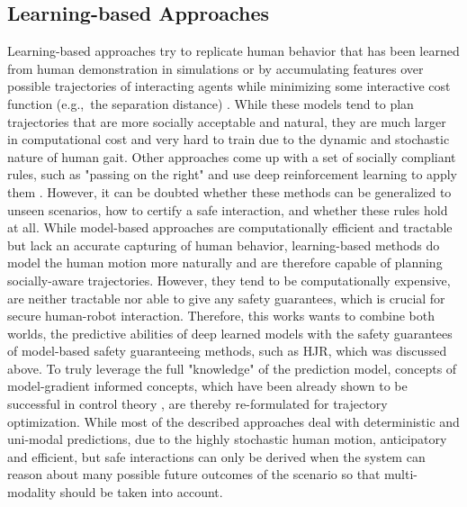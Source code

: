 \subsection{Learning-based Approaches}
Learning-based approaches try to replicate human behavior that has been learned from human demonstration in simulations or by accumulating features over possible trajectories of interacting agents while minimizing some interactive cost function (e.g.,\ the separation distance) \cite{Kim2016}\cite{Kretzschmar2016}. While these models tend to plan trajectories that are more socially acceptable and natural, they are much larger in computational cost and very hard to train due to the dynamic and stochastic nature of human gait. Other approaches come up with a set of socially compliant rules, such as "passing on the right" and use deep reinforcement learning to apply them  \cite{Knepper2012}\cite{Chen2017}\cite{Everett2018}. However, it can be doubted whether these methods can be generalized to unseen scenarios, how to certify a safe interaction, and whether these rules hold at all.
\newline\newline
While model-based approaches are computationally efficient and tractable but lack an accurate capturing of human behavior, learning-based methods do model the human motion more naturally and are therefore capable of planning socially-aware trajectories. However, they tend to be computationally expensive, are neither tractable nor able to give any safety guarantees, which is crucial for secure human-robot interaction. Therefore, this works wants to combine both worlds, the predictive abilities of deep learned models with the safety guarantees of model-based safety guaranteeing methods, such as \ac{HJR}, which was discussed above. To truly leverage the full "knowledge" of the prediction model, concepts of model-gradient informed concepts, which have been already shown to be successful in control theory \cite{Chen2019}\cite{Fan2020}, are thereby re-formulated for trajectory optimization. While most of the described approaches deal with deterministic and uni-modal predictions, due to the highly stochastic human motion, anticipatory and efficient, but safe interactions can only be derived when the system can reason about many possible future outcomes of the scenario so that multi-modality should be taken into account.


